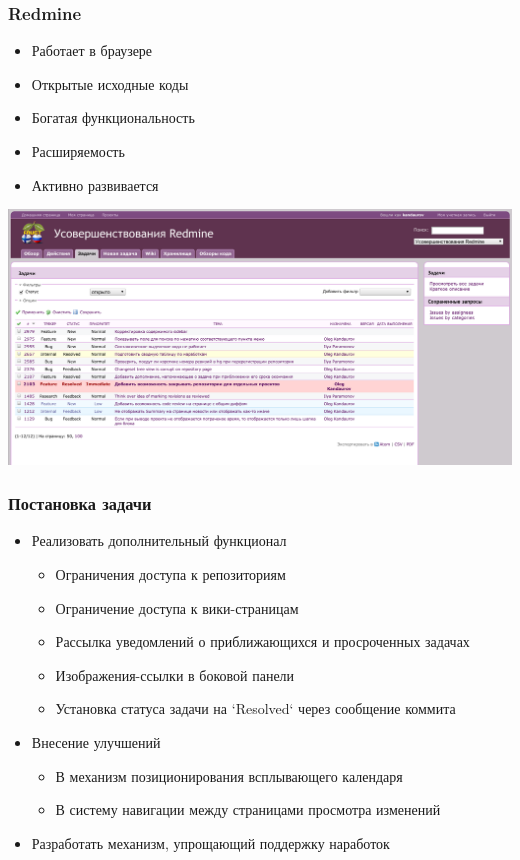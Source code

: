 \documentclass[unicode]{beamer}
\begin{document}
\begin{frame}
\transwipe[direction=90]
\frametitle{Redmine}
\begin{block}{}
\small
\begin{itemize}
   \item Работает в браузере
   \item Открытые исходные коды
   \item Богатая функциональность
   \item Расширяемость
   \item Активно развивается
\end{itemize}
\end{block}
\centerline{\includegraphics[width=1\textwidth]{redmine-issues.png}}
\end{frame}

\begin{frame}
\transwipe[direction=90]
\frametitle{Постановка задачи}
\begin{block}{}
\begin{itemize}
  \item Реализовать дополнительный функционал
  \begin{itemize}
    \item Ограничения доступа к репозиториям
    \item Ограничение доступа к вики-страницам
    \item Рассылка уведомлений о приближающихся и просроченных задачах
    \item Изображения-ссылки в боковой панели
    \item Установка статуса задачи на `Resolved` через сообщение коммита
  \end{itemize}
  \item Внесение улучшений
  \begin{itemize}
    \item В механизм позиционирования всплывающего календаря
    \item В систему навигации между страницами просмотра изменений
  \end{itemize}
  \item Разработать механизм, упрощающий поддержку наработок
\end{itemize}
\end{block}
\end{frame}
\end{document}
